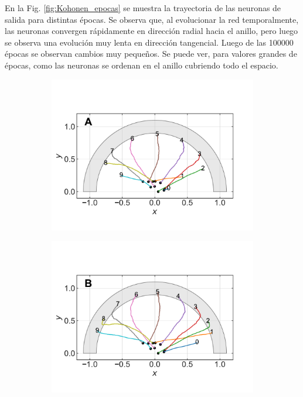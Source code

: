 \documentclass[11pt,twocolumn,twoside]{opticajnl}
\begin{document}
En la Fig. \ref{fig:Kohonen_epocas} se muestra la trayectoria de las neuronas de salida para distintas épocas. Se observa que, al evolucionar la red temporalmente, las neuronas convergen rápidamente en dirección radial hacia el anillo, pero luego se observa una evolución muy lenta en dirección tangencial. Luego de las 100000 épocas se observan cambios muy pequeños. Se puede ver, para valores grandes de épocas, como las neuronas se ordenan en el anillo cubriendo todo el espacio.

\begin{figure}[h]
    \centering
         \begin{subfigure}[b]{0.33\linewidth}
            \centering
            \includegraphics[width=1.1\textwidth]{Figuras/pesos_sigma_1_epochs_10000_lr_0.001.pdf}
         \end{subfigure}
         \begin{subfigure}[b]{0.33\linewidth}
            \centering
            \includegraphics[width=1.1\textwidth]{Figuras/pesos_sigma_1_epochs_25000_lr_0.001.pdf}

\end{subfigure}
\end{figure}
\end{document}
